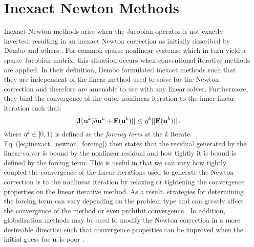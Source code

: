 \section{Inexact Newton Methods}
\label{sec:newton_methods}
Inexact Newton methods arise when the Jacobian operator is not exactly
inverted, resulting in an inexact Newton correction as initially
described by Dembo and others \citep{dembo_inexact_1982}. For common
sparse nonlinear systems, which in turn yield a sparse Jacobian
matrix, this situation occurs when conventional iterative methods are
applied. In their definition, Dembo formulated inexact methods such
that they are independent of the linear method used to solve for the
Newton correction and therefore are amenable to use with any linear
solver. Furthermore, they bind the convergence of the outer nonlinear
iteration to the inner linear iteration such that:
\begin{equation}
  ||\mathbf{J}(\mathbf{u}^k)\delta \mathbf{u}^k + \mathbf{F}(\mathbf{u}^k)|| \leq \eta^k
  ||\mathbf{F}(\mathbf{u}^k)||\:,
  \label{eq:inexact_newton_forcing}
\end{equation}
where $\eta^k \in [0,1)$ is defined as the \textit{forcing term} at
  the $k$ iterate. Eq~(\ref{eq:inexact_newton_forcing}) then states
  that the residual generated by the linear solver is bound by the
  nonlinear residual and how tightly it is bound is defined by the
  forcing term. This is useful in that we can vary how tightly coupled
  the convergence of the linear iterations used to generate the Newton
  correction is to the nonlinear iteration by relaxing or tightening
  the convergence properties on the linear iterative method. As a
  result, strategies for determining the forcing term can vary
  depending on the problem type and can greatly affect the convergence
  of the method or even prohibit convergence
  \citep{eisenstat_choosing_1996}. In addition, globalization methods
  may be used to modify the Newton correction in a more desireable
  direction such that convergence properties can be improved when the
  initial guess for $\mathbf{u}$ is poor
  \citep{pawlowski_globalization_2006}.

